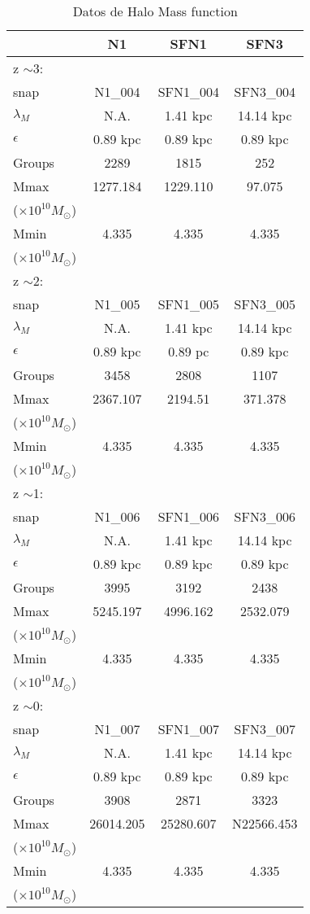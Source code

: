 \documentclass[a4paper,openright,10pt, oneside, final]{book}
\begin{document}
\begin{table}
\caption{Datos de Halo Mass function}
\label{Tabla 4.5}\centering%
\begin{tabularx}{0.9\textwidth}{@{\extracolsep{\fill}}  l c c c }
\toprule%
&N1&SFN1&SFN3 \\\toprule%
z $\sim $3:\\
\textsf{snap}&N1\_{004}&SFN1\_{004}&SFN3\_{004}\\
$\lambda_{M}$&N.A.&1.41 kpc& 14.14 kpc\\
$\epsilon$&0.89 kpc&0.89 kpc& 0.89 kpc\\
\textsf{Groups}&2289&1815&252\\
\textsf{Mmax}&1277.184&1229.110&97.075\\
($\times10^{10}M_\odot$)\\
\textsf{Mmin}&4.335&4.335&4.335\\
($\times10^{10}M_\odot$)\\\midrule
z $\sim $2:\\
\textsf{snap}&N1\_{005}&SFN1\_{005}&SFN3\_{005}\\
$\lambda_{M}$&N.A.&1.41 kpc& 14.14 kpc\\
$\epsilon$&0.89 kpc&0.89 pc& 0.89 kpc\\
\textsf{Groups}&3458&2808&1107\\
\textsf{Mmax}&2367.107&2194.51&371.378\\
($\times10^{10}M_\odot$)\\
\textsf{Mmin}&4.335&4.335&4.335\\
($\times10^{10}M_\odot$)\\\midrule
z $\sim $1:\\
\textsf{snap}&N1\_{006}&SFN1\_{006}&SFN3\_{006}\\
$\lambda_{M}$&N.A.&1.41 kpc&14.14 kpc\\
$\epsilon$&0.89 kpc&0.89 kpc& 0.89 kpc\\
\textsf{Groups}&3995&3192&2438\\
\textsf{Mmax}&5245.197&4996.162&2532.079\\
($\times10^{10}M_\odot$)\\
\textsf{Mmin}&4.335&4.335&4.335\\
($\times10^{10}M_\odot$)\\\midrule
z $\sim $0:\\
\textsf{snap}&N1\_{007}&SFN1\_{007}&SFN3\_{007}\\
$\lambda_{M}$&N.A.&1.41 kpc&14.14 kpc\\
$\epsilon$&0.89 kpc&0.89 kpc& 0.89 kpc\\
\textsf{Groups}&3908&2871&3323\\
\textsf{Mmax}&26014.205&25280.607&N22566.453\\
($\times10^{10}M_\odot$)\\
\textsf{Mmin}&4.335&4.335&4.335\\
($\times10^{10}M_\odot$)\\\bottomrule
\end{tabularx}
\end{table} 
\end{document}
